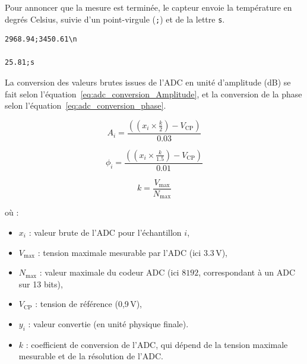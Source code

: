 Pour annoncer que la mesure est terminée, le capteur envoie la température en degrés Celsius, suivie d’un point-virgule (\texttt{;}) et de la lettre \texttt{s}.

\begin{verbatim}
2968.94;3450.61\n

25.81;s
\end{verbatim}

La conversion des valeurs brutes issues de l'ADC en unité d'amplitude (dB) se fait selon l'équation~\ref{eq:adc_conversion_Amplitude}, et la conversion de la phase selon l'équation~\ref{eq:adc_conversion_phase}.

\begin{equation}
A_i = \frac{\left( \left( x_i \times \frac{k}{2} \right) - V_{\text{CP}} \right)}{0.03}
\label{eq:adc_conversion_Amplitude}
\end{equation}

\begin{equation}
\phi_i = \frac{\left( \left( x_i \times \frac{k}{1.5} \right) - V_{\text{CP}} \right)}{0.01}
\label{eq:adc_conversion_phase}
\end{equation}

\begin{equation}
k = \frac{V_{\text{max}}}{N_{\text{max}}}
\label{eq:adc_conversion}
\end{equation}

où :
\begin{itemize}[label=\textbullet]
    \item $x_i$ : valeur brute de l'ADC pour l'échantillon $i$,
    \item $V_{\text{max}}$ : tension maximale mesurable par l'ADC (ici $3.3\,\mathrm{V}$),
    \item $N_{\text{max}}$ : valeur maximale du codeur ADC (ici $8192$, correspondant à un ADC sur 13 bits),
    \item $V_{\text{CP}}$ : tension de référence (0,9\,V),
    \item $y_i$ : valeur convertie (en unité physique finale).
    \item $k$ : coefficient de conversion de l'ADC, qui dépend de la tension maximale mesurable et de la résolution de l'ADC.   
\end{itemize}
\newpage
